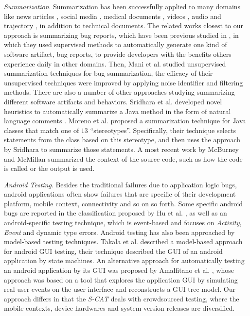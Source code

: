 \documentclass[10pt,conference]{IEEEtran}
\begin{document}
\emph{Summarization}. Summarization has been successfully applied to many domains like news articles \cite{radev2001newsinessence}, social media \cite{lin2009summarization},
medical documents \cite{afantenos2005summarization}, videos \cite{han2011personalized}, audio \cite{waibel2001advances} and trajectory \cite{su2015making},
in addition to technical documents. The related works closest to our approach is summarizing bug reports, which have been previous studied in \cite{rastkar2010summarizing}, in which they used
supervised methods to automatically generate one kind of software artifact, bug reports, to provide developers with the benefits others experience daily in other
domains. Then, Mani et al. \cite{mani2012ausum} studied unsupervised summarization techniques for bug summarization, the efficacy of their unsupervised techniques
were improved by applying noise identifier and filtering methods. There are also a number of other approaches studying summarizing different software artifacts and behaviors.
Sridhara et al. developed novel heuristics to automatically summarize a Java method in the form of natural language comments \cite{sridhara2010towards}. Moreno et al. \cite{haiduc2010use} proposed a summarization
technique for Java classes that match one of $13$ ``stereotypes''. Specifically, their technique selects statements from the class based on this stereotype, and then
uses the approach by Sridhara \cite{sridhara2010towards} to summarize those statements. A most recent work by McBurney and McMillan \cite{mcburney2015automatic}
summarized the context of the source code, such as how the code is called or the output is used.

\emph{Android Testing}. Besides the traditional failures due to application logic bugs, android applications often show failures that are specific of their development platform,
mobile context, connectivity and so on so forth. Some specific android bugs are reported in the classification proposed by Hu et al. \cite{hu2011automating},
as well as an android-specific testing technique, which is event-based and focuses on \emph{Activity}, \emph{Event} and dynamic type errors. Android
testing has also been approached by model-based testing techniques. Takala et al. \cite{takala2011experiences} described a model-based approach
for android GUI testing, their technique described the GUI of an android application by state machines. An alternative approach for automatically testing
an android application by its GUI was proposed by Amalfitano et al. \cite{amalfitano2011gui}, whose approach was based on a tool that explores the application
GUI by simulating real user events on the user interface and reconstructs a GUI tree model. Our approach differs in that the \emph{S-CAT} deals with crowdsourced testing,
where the mobile contexts, device hardwares and system version releases are diversified.
\end{document}
